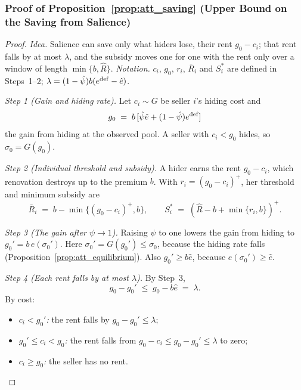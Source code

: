 \subsubsection*{Proof of Proposition~\ref{prop:att_saving} (Upper Bound on the Saving from Salience)}

\begin{proof}\upshape
\emph{Idea.} Salience can save only what hiders lose, their rent $g_0-c_i$; that rent falls by at most $\lambda$, and the subsidy moves one for one with the rent only over a window of length $\min\{b,\hat R\}$. \emph{Notation.} $c_i$, $g_0$, $r_i$, $\bar R_i$ and $S_i^*$ are defined in Steps~1--2; $\lambda=(1-\hat\psi)b(e^{\rm def}-\hat e)$.

\emph{Step 1 (Gain and hiding rate).} Let $c_i\sim G$ be seller $i$'s hiding cost and
\begin{equation*}
    g_0\;=\;b\,[\hat\psi\hat e+(1-\hat\psi)e^{\rm def}]
\end{equation*}
the gain from hiding at the observed pool. A seller with $c_i<g_0$ hides, so $\hat\sigma_0=G(g_0)$.

\emph{Step 2 (Individual threshold and subsidy).} A hider earns the rent $g_0-c_i$, which renovation destroys up to the premium $b$. With $r_i=(g_0-c_i)^+$, her threshold and minimum subsidy are
\begin{equation*}
    \bar R_i\;=\;b-\min\{(g_0-c_i)^+,b\},\qquad S_i^*\;=\;(\hat R-b+\min\{r_i,b\})^+.
\end{equation*}

\emph{Step 3 (The gain after $\psi\to1$).} Raising $\psi$ to one lowers the gain from hiding to $g_0'=b\,e(\sigma_0')$. Here $\sigma_0'=G(g_0')\le\hat\sigma_0$, because the hiding rate falls (Proposition~\ref{prop:att_equilibrium}). Also $g_0'\ge b\hat e$, because $e(\sigma_0')\ge\hat e$.

\emph{Step 4 (Each rent falls by at most $\lambda$).} By Step~3,
\begin{equation*}
    g_0-g_0'\;\le\;g_0-b\hat e\;=\;\lambda.
\end{equation*}
By cost:
\begin{itemize}
    \item \emph{$c_i<g_0'$:} the rent falls by $g_0-g_0'\le\lambda$;
    \item \emph{$g_0'\le c_i<g_0$:} the rent falls from $g_0-c_i\le g_0-g_0'\le\lambda$ to zero;
    \item \emph{$c_i\ge g_0$:} the seller has no rent.
\end{itemize}


\end{proof}
